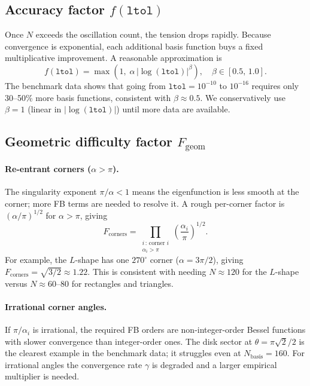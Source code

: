 \documentclass[11pt]{article}
\newcommand{\Nbasis}{N_{\mathrm{basis}}}
\newcommand{\ltol}{\texttt{ltol}}
\begin{document}
\subsection{Accuracy factor \texorpdfstring{$f(\ltol)$}{f(ltol)}}

Once $N$ exceeds the oscillation count, the tension drops rapidly.  Because
convergence is exponential, each additional basis function buys a fixed
multiplicative improvement.  A reasonable approximation is
\[
  f(\ltol) = \max\!\left(1,\;\alpha\,|\log(\ltol)|^\beta\right),
  \quad \beta\in[0.5,\,1.0].
\]
The benchmark data shows that going from $\ltol=10^{-10}$ to $10^{-16}$ requires
only 30--50\% more basis functions, consistent with $\beta\approx 0.5$.  We
conservatively use $\beta=1$ (linear in $|\log(\ltol)|$) until more data are
available.

\subsection{Geometric difficulty factor \texorpdfstring{$F_{\mathrm{geom}}$}{F\_geom}}

\paragraph{Re-entrant corners ($\alpha>\pi$).}
The singularity exponent $\pi/\alpha<1$ means the eigenfunction is less smooth
at the corner; more FB terms are needed to resolve it.  A rough per-corner
factor is $(\alpha/\pi)^{1/2}$ for $\alpha>\pi$, giving
\begin{equation}
  F_{\mathrm{corners}}
  = \prod_{\substack{i\,:\,\text{corner }i\\\alpha_i>\pi}}
    \left(\frac{\alpha_i}{\pi}\right)^{1/2}.
\end{equation}
For example, the $L$-shape has one $270^\circ$ corner ($\alpha=3\pi/2$), giving
$F_{\mathrm{corners}}=\sqrt{3/2}\approx 1.22$.  This is consistent with
needing $N\approx 120$ for the $L$-shape versus $N\approx 60$--$80$ for
rectangles and triangles.

\paragraph{Irrational corner angles.}
If $\pi/\alpha_i$ is irrational, the required FB orders are non-integer-order
Bessel functions with slower convergence than integer-order ones.  The disk
sector at $\theta=\pi\sqrt{2}/2$ is the clearest example in the benchmark data;
it struggles even at $\Nbasis=160$.  For irrational angles the convergence
rate $\gamma$ is degraded and a larger empirical multiplier is needed.
\end{document}
